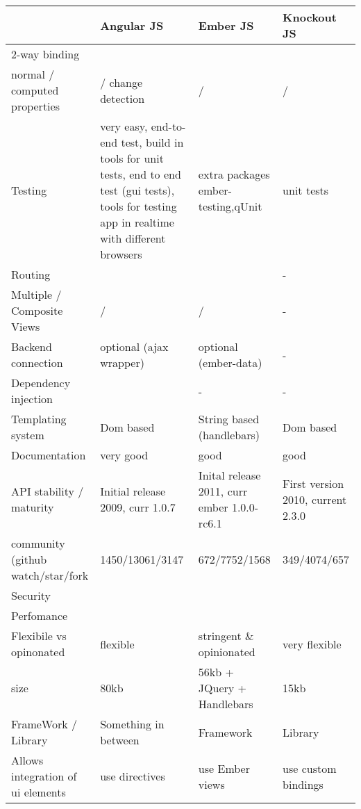 \begin{landscape}
	\begin{longtable}{| p{5cm} | p{5cm} | p{5cm} | p{5cm} |}
	\hline
		& Angular JS				
		& Ember JS	
		& Knockout JS \\ \hline
	2-way binding	 		
		& \checkmark
		& \checkmark
		& \checkmark  \\ \hline
	normal / computed properties	
		& \checkmark / change detection
		& \checkmark / \checkmark
		& \checkmark / \checkmark\\ \hline
	Testing				
		& very easy, end-to-end test, build in tools for unit tests, 
		  end to end test (gui tests), tools for testing app in realtime with different browsers 
		& extra packages ember-testing,qUnit 
		&  unit tests \\ \hline
	Routing				
		& \checkmark 
		& \checkmark	
		& -		\\ \hline
	Multiple / Composite Views	
		& \checkmark / \checkmark
		& \checkmark / \checkmark 
		& -		\\ \hline
	Backend connection		
		& optional (ajax wrapper)	
		& optional (ember-data)	
		& -	\\ \hline
	Dependency injection
		& \checkmark
		& -
		& -\\ \hline
	Templating system
		& Dom based 
		& String based (handlebars)
		& Dom based\\ \hline
	Documentation
		& very good
		& good
		& good\\ \hline
	API stability / maturity
		& Initial release 2009, curr 1.0.7
		& Inital release 2011, curr ember 1.0.0-rc6.1
		& First version 2010, current 2.3.0\\ \hline
	community (github watch/star/fork
		& 1450/13061/3147
		& 672/7752/1568
		& 349/4074/657\\ \hline
	Security
		&
		&
		& \\ \hline
	Perfomance
		&
		&
		& \\ \hline
	Flexibile vs opinonated
		& flexible
		& stringent \& opinionated
		& very flexible\\ \hline
	size
		& 80kb
		& 56kb + JQuery + Handlebars
		& 15kb\\ \hline	
	FrameWork / Library
		& Something in between
		& Framework
		& Library\\ \hline
	Allows integration of ui elements
		& \checkmark use directives
		& \checkmark use Ember views
		& \checkmark use custom bindings \\ \hline
	\end{longtable}
\end{landscape}
